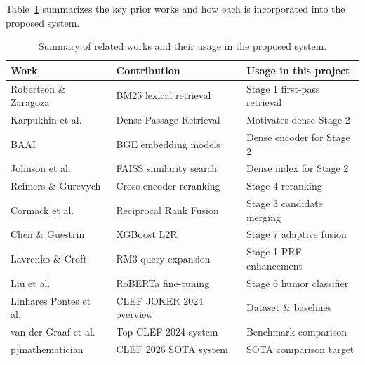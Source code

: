 Table~\ref{tab:related} summarizes the key prior works and how each is incorporated into the proposed system.

\begin{table}[H]
\centering
\begin{tabular}{|p{4cm}|p{4cm}|p{5cm}|}
\hline
\textbf{Work} & \textbf{Contribution} & \textbf{Usage in this project} \\\hline
Robertson \& Zaragoza \cite{bm25} & BM25 lexical retrieval & Stage 1 first-pass retrieval \\\hline
Karpukhin et al.\ \cite{dpr} & Dense Passage Retrieval & Motivates dense Stage 2 \\\hline
BAAI \cite{bge} & BGE embedding models & Dense encoder for Stage 2 \\\hline
Johnson et al.\ \cite{faiss} & FAISS similarity search & Dense index for Stage 2 \\\hline
Reimers \& Gurevych \cite{sbert} & Cross-encoder reranking & Stage 4 reranking \\\hline
Cormack et al.\ \cite{rrf} & Reciprocal Rank Fusion & Stage 3 candidate merging \\\hline
Chen \& Guestrin \cite{xgboost} & XGBoost L2R & Stage 7 adaptive fusion \\\hline
Lavrenko \& Croft \cite{rm3} & RM3 query expansion & Stage 1 PRF enhancement \\\hline
Liu et al.\ \cite{roberta} & RoBERTa fine-tuning & Stage 6 humor classifier \\\hline
Linhares Pontes et al.\ \cite{joker2024} & CLEF JOKER 2024 overview & Dataset \& baselines \\\hline
van der Graaf et al.\ \cite{uams2024} & Top CLEF 2024 system & Benchmark comparison \\\hline
pjmathematician \cite{sota2026} & CLEF 2026 SOTA system & SOTA comparison target \\\hline
\end{tabular}
\caption{Summary of related works and their usage in the proposed system.}
\label{tab:related}
\end{table}
